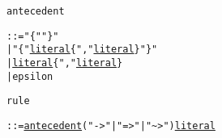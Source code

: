 
\begin{alltt}
\hypertarget{antecedentP\newLinkVer}{antecedent} ::=   "\verb"{"" "\verb"}""
               | "\verb"{"" \hyperlink{literalP\linkVer}{literal} \verb"{""," \hyperlink{literalP\linkVer}{literal}\verb"}" "\verb"}""
               | \hyperlink{literalP\linkVer}{literal} \verb"{""," \hyperlink{literalP\linkVer}{literal}\verb"}"
               | epsilon

\hypertarget{ruleP\newLinkVer}{rule} ::= \hyperlink{antecedentP\linkVer}{antecedent} ("\verb"->"" | "\verb"=>"" | "\verb"~>"") \hyperlink{literalP\linkVer}{literal}
\end{alltt}

